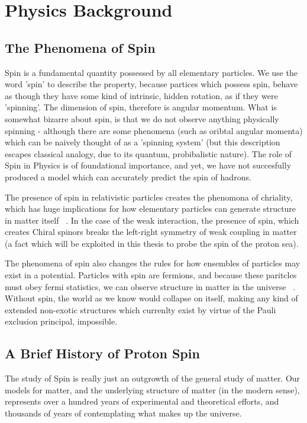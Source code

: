 \chapter{Physics Background}
\section{The Phenomena of Spin}

Spin is a fundamental quantity possessed by all elementary particles. We use
the word 'spin' to describe the property, because partices which possess spin,
behave as though they have some kind of intrinsic, hidden rotation, as if they
were 'spinning'. The dimension of spin, therefore is angular momentum. What is
somewhat bizarre about spin, is that we do not observe anything physically
spinning - although there are some phenomena (such as oribtal angular momenta)
which can be naively thought of as a 'spinning system' (but this description
escapes classical analogy, due to its quantum, probibalistic nature). The role
of Spin in Physics is of foundational importance, and yet, we have not
succesfully produced a model which can accurately predict the spin of hadrons.

The presence of spin in relativistic particles creates the phenomona of
chriality, which has huge implications for how elementary particles can generate
structure in matter itself ~\needcite{}. In the case of the weak interaction,
the presence of spin, which creates Chiral spinors breaks the left-right
symmetry of weak coupling in matter (a fact which will be exploited in this
thesis to probe the spin of the proton sea).

The phenomena of spin also changes the rules for how ensembles of particles may
exist in a potential. Particles with spin are fermions, and because these
paritcles must obey fermi statistics, we can observe structure in matter in the
universe ~\needcite{}. Without spin, the world as we know would collapse on
itself, making any kind of extended non-exotic structures which currenlty exist
by virtue of the Pauli exclusion principal, impossible.

\section{A Brief History of Proton Spin}

The study of Spin is really just an outgrowth of the general study of matter.
Our models for matter, and the underlying structure of matter (in the modern
sense), represents over a hundred years of experimental and theoretical efforts,
and thousands of years of contemplating what makes up the universe.

